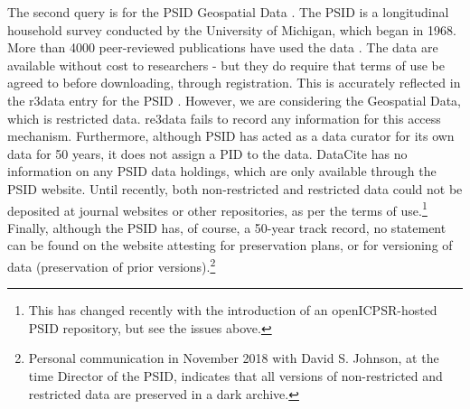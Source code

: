 The second query is for the \ac{PSID} Geospatial Data \parencite{psid-geodata}. The \ac{PSID} is a longitudinal household survey conducted by the University of Michigan, which began in 1968. More than 4000 peer-reviewed publications have used the data \parencite{psid-homepage}. The data are available without cost to researchers - but they do require that terms of use be agreed to before downloading, through registration. This is accurately reflected in the r3data entry for the \ac{PSID} \parencite{Re3data-psid}. However, we are considering the Geospatial Data, which is restricted data. re3data fails to record any information for this access mechanism. Furthermore, although \ac{PSID} has acted as a data curator for its own data for 50 years, it does not assign a \ac{PID} to the data. DataCite has no information on any  \ac{PSID} data holdings, which are only available through the \ac{PSID} website. Until recently, both non-restricted and restricted data could not be deposited at journal websites or other repositories, as per the terms of use.\footnote{This has changed recently with the introduction of an openICPSR-hosted \ac{PSID} repository, but see the issues above.} Finally, although the \ac{PSID} has, of course, a 50-year track record, no statement can be found on the website attesting for preservation plans, or for versioning of data (preservation of prior versions).\footnote{Personal communication in November 2018 with David S. Johnson, at the time Director of the \ac{PSID}, indicates that all versions of non-restricted and restricted data are preserved in a dark archive.}

